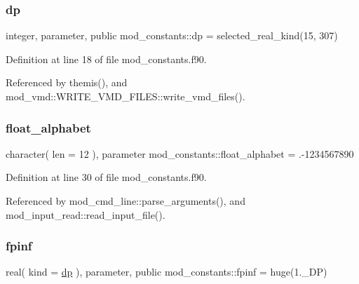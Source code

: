 \mbox{\label{namespacemod__constants_ac7aeda7f1802c4ef2a4780773c028214}} 
\subsubsection{\texorpdfstring{dp}{dp}}
{\footnotesize\ttfamily integer, parameter, public mod\+\_\+constants\+::dp = selected\+\_\+real\+\_\+kind(15, 307)}



Definition at line 18 of file mod\+\_\+constants.\+f90.



Referenced by themis(), and mod\+\_\+vmd\+::\+W\+R\+I\+T\+E\+\_\+\+V\+M\+D\+\_\+\+F\+I\+L\+E\+S\+::write\+\_\+vmd\+\_\+files().

\mbox{\label{namespacemod__constants_a4b168363a34adf3e1236769aa1ec0fed}} 
\subsubsection{\texorpdfstring{float\+\_\+alphabet}{float\_alphabet}}
{\footnotesize\ttfamily character( len = 12 ), parameter mod\+\_\+constants\+::float\+\_\+alphabet = \textquotesingle{}.-\/1234567890\textquotesingle{}}



Definition at line 30 of file mod\+\_\+constants.\+f90.



Referenced by mod\+\_\+cmd\+\_\+line\+::parse\+\_\+arguments(), and mod\+\_\+input\+\_\+read\+::read\+\_\+input\+\_\+file().

\mbox{\label{namespacemod__constants_a64820d61363b4adcee8f4f810662e836}} 
\subsubsection{\texorpdfstring{fpinf}{fpinf}}
{\footnotesize\ttfamily real( kind = \hyperlink{namespacemod__constants_ac7aeda7f1802c4ef2a4780773c028214}{dp} ), parameter, public mod\+\_\+constants\+::fpinf = huge(1.\+\_\+\+D\+P)}



